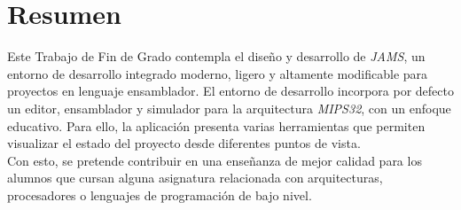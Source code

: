 \chapter{Resumen} \label{ch:resumen}

Este Trabajo de Fin de Grado contempla el diseño y desarrollo de \textit{JAMS},
un entorno de desarrollo integrado moderno, ligero y altamente modificable
para proyectos en lenguaje ensamblador.
El entorno de desarrollo incorpora por defecto un editor, ensamblador y simulador
para la arquitectura \textit{MIPS32}, con un enfoque educativo.
Para ello, la aplicación presenta varias herramientas que permiten
visualizar el estado del proyecto desde diferentes puntos de vista.\\
Con esto, se pretende contribuir en una enseñanza de mejor calidad para
los alumnos que cursan alguna asignatura relacionada con arquitecturas,
procesadores o lenguajes de programación de bajo nivel.
